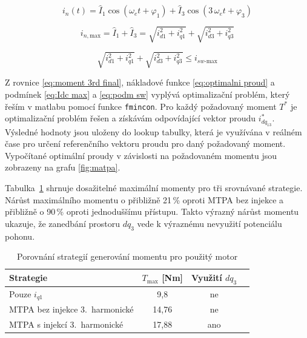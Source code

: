 \begin{equation}
    \label{eq:okamzity i}
    i_{n}(t) = \hat{I}_1 \cos(\omega_e t + \varphi_1) + \hat{I}_3 \cos(3\,\omega_e t + \varphi_3)
\end{equation}

\begin{equation}
    \label{eq:isw max}
    i_{n,\text{max}} = \hat{I}_1 + \hat{I}_3 = \sqrt{i_{d1}^2 + i_{q1}^2} + \sqrt{i_{d3}^2 + i_{q3}^2}
\end{equation}

\begin{equation}
    \label{eq:podm sw}
    \sqrt{i_{d1}^2 + i_{q1}^2} + \sqrt{i_{d3}^2 + i_{q3}^2} \leq i_{sw\text{-max}}
\end{equation}


Z rovnice \ref{eq:moment 3rd final}, nákladové funkce \ref{eq:optimalni proud} a podmínek \ref{eq:Idc max} a \ref{eq:podm sw} vyplývá optimalizační problém, který řeším v matlabu pomocí funkce \texttt{fmincon}. Pro každý požadovaný moment $T^*$ je optimalizační problém řešen a získávám odpovídající vektor proudu $i_{dq_{13}}^*$. Výsledné hodnoty jsou uloženy do lookup tabulky, která je využívána v reálném čase pro určení referenčního vektoru proudu pro daný požadovaný moment. Vypočítané optimální proudy v závislosti na požadovaném momentu jsou zobrazeny na grafu \ref{fig:matpa}. 



Tabulka~\ref{tab:porovnani moment} shrnuje dosažitelné maximální momenty
pro tři srovnávané strategie. Nárůst maximálního momentu o přibližně 21\,\% oproti MTPA bez injekce a přibližně o 90\,\% oproti jednoduššímu přístupu. Takto výrazný nárůst momentu ukazuje, že zanedbání prostoru $dq_3$ vede k výraznému nevyužití potenciálu pohonu.

\begin{table}[h]
\centering
\begin{tabular}{lccc}
\toprule
\textbf{Strategie} & $T_{\max}$ [Nm]  & Využití $dq_3$  \\
\midrule
Pouze $i_{q1}$                  &  9{,}8   & ne \\
MTPA bez injekce 3.~harmonické  & 14{,}76 & ne \\
MTPA s injekcí 3.~harmonické    & 17{,}88  & ano \\
\bottomrule
\end{tabular}
\caption{Porovnání strategií generování momentu pro použitý motor}
\label{tab:porovnani moment}
\end{table}




